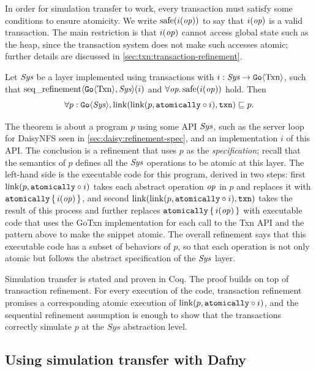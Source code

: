 In order for simulation transfer to work, every transaction must satisfy some
conditions to ensure atomicity. We write $\mathrm{safe}(i(\mathit{op}))$ to say that $i(\mathit{op})$ is a
valid transaction. The main restriction is that $i(\mathit{op})$ cannot access global state
such as the heap, since the transaction system does not make such accesses
atomic; further details are discussed in \cref{sec:txn:transaction-refinement}.

\begin{theorem}
  Let $\textit{Sys}$ be a layer implemented using transactions with
$i : \textit{Sys} \to \mathtt{Go}\langle \mathrm{Txn} \rangle$, such that
$\operatorname{seq\_refinement}\langle \mathtt{Go}\langle \mathrm{Txn} \rangle, \textit{Sys} \rangle(i)$ and
$\forall \mathit{op}.\, \mathrm{safe}(i(\mathit{op}))$ hold. Then
\[
  \forall p : \mathtt{Go}\langle \mathit{Sys} \rangle, \mathrm{link}(\mathrm{link}(p, \mathtt{atomically}\circ i), \texttt{txn}) \sqsubseteq p.
\]
\label{thm:gotxn-transfer}
\end{theorem}
\nopagebreak

The theorem is about a program $p$ using some API $\mathit{Sys}$, such as the server
loop for DaisyNFS seen in \cref{sec:daisy:refinement-spec}, and an
implementation $i$ of this API.\@
The conclusion is a refinement that uses $p$ as the \emph{specification}; recall
that the semantics of $p$ defines all the $\mathit{Sys}$ operations to be atomic at this
layer. The left-hand side is the executable code for this program, derived in
two steps: first $\mathrm{link}(p, \mathtt{atomically}\circ i)$ takes each abstract operation
$\mathit{op}$ in $p$ and replaces it with $\mathtt{atomically}\,\{\, i(\mathit{op}) \,\}$, and second
$\mathrm{link}(\mathrm{link}(p, \mathtt{atomically}\circ i), \texttt{txn})$ takes the result of this process and
further replaces $\mathtt{atomically}\,\{\, i(\mathit{op}) \,\}$ with executable code that uses the GoTxn
implementation for each call to the Txn API and the  pattern above to
make the snippet atomic. The overall refinement says that this executable code
has a subset of behaviors of $p$, so that each operation is not only atomic but
follows the abstract specification of the $\mathit{Sys}$ layer.

Simulation transfer is stated and proven in Coq. The proof builds on top of
transaction refinement. For every execution of the code, transaction refinement promises
a corresponding atomic execution of $\mathrm{link}(p, \mathtt{atomically}\circ i)$, and the
sequential refinement assumption is enough to show that the transactions
correctly simulate $p$ at the $\mathit{Sys}$ abstraction level.

\subsection{Using simulation transfer with Dafny}%
\label{sec:daisy:proof-dafny}

